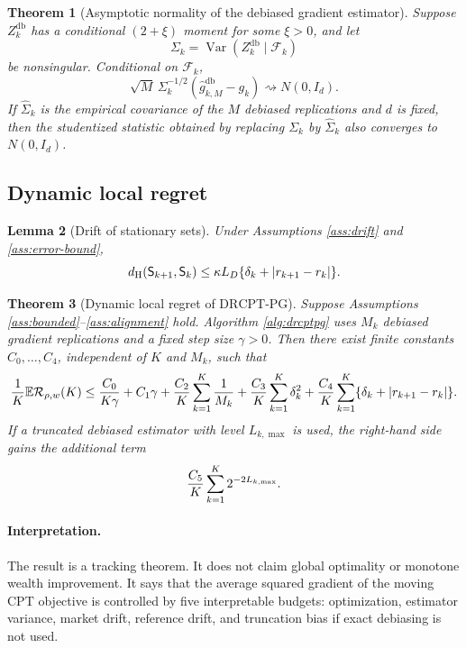 \documentclass[11pt]{article}
\newtheorem{theorem}{Theorem}[section]
\newtheorem{lemma}[theorem]{Lemma}
\newcommand{\E}{\mathbb E}
\newcommand{\Var}{\operatorname{Var}}
\newcommand{\1}{\mathbf 1}
\DeclarePairedDelimiter{\abs}{\lvert}{\rvert}
\newcommand{\cF}{\mathcal F}
\newcommand{\CPT}{\ensuremath{\mathrm{CPT}}\xspace}
\newcommand{\DRCPTPG}{\ensuremath{\mathrm{DRCPT\mbox{-}PG}}\xspace}
\newcommand{\Reg}{\mathcal R}
\newcommand{\Sta}{\mathsf S}
\newcommand{\dH}{d_{\mathrm H}}
\newcommand{\db}{\mathrm{db}}
\begin{document}
\begin{theorem}[Asymptotic normality of the debiased gradient estimator]\label{thm:clt}
Suppose $Z_k^{\db}$ has a conditional $(2+\xi)$ moment for some $\xi>0$, and let
\[
 \Sigma_k=\Var(Z_k^{\db}\mid\cF_k)
\]
be nonsingular.  Conditional on $\cF_k$,
\begin{equation}\label{eq:clt}
 \sqrt{M}\,\Sigma_k^{-1/2}(\widehat g_{k,M}^{\db}-g_k)
 \rightsquigarrow N(0,I_d).
\end{equation}
If $\widehat\Sigma_k$ is the empirical covariance of the $M$ debiased replications and $d$ is fixed, then the studentized statistic obtained by replacing $\Sigma_k$ by $\widehat\Sigma_k$ also converges to $N(0,I_d)$.
\end{theorem}

\subsection{Dynamic local regret}

\begin{lemma}[Drift of stationary sets]\label{lem:set-drift}
Under Assumptions \ref{ass:drift} and \ref{ass:error-bound},
\begin{equation}\label{eq:set-drift}
 \dH(\Sta_{k+1},\Sta_k)
 \le \kappa L_D\{\delta_k+\abs{r_{k+1}-r_k}\}.
\end{equation}
\end{lemma}

\begin{theorem}[Dynamic local regret of \DRCPTPG]\label{thm:dynamic-regret}
Suppose Assumptions \ref{ass:bounded}--\ref{ass:alignment} hold.  Algorithm \ref{alg:drcptpg} uses $M_k$ debiased gradient replications and a fixed step size $\gamma>0$.  Then there exist finite constants $C_0,\ldots,C_4$, independent of $K$ and $M_k$, such that
\begin{equation}\label{eq:main-bound}
 {1\over K}\E\Reg_{\rho,w}(K)
 \le {C_0\over K\gamma}+C_1\gamma
 +{C_2\over K}\sum_{k=1}^{K}{1\over M_k}
 +{C_3\over K}\sum_{k=1}^{K}\delta_k^2
 +{C_4\over K}\sum_{k=1}^{K}\{\delta_k+\abs{r_{k+1}-r_k}\}.
\end{equation}
If a truncated debiased estimator with level $L_{k,\max}$ is used, the right-hand side gains the additional term
\[
 {C_5\over K}\sum_{k=1}^{K}2^{-2L_{k,\max}}.
\]
\end{theorem}

\paragraph{Interpretation.}
The result is a tracking theorem.  It does not claim global optimality or monotone wealth improvement.  It says that the average squared gradient of the moving \CPT objective is controlled by five interpretable budgets: optimization, estimator variance, market drift, reference drift, and truncation bias if exact debiasing is not used.
\end{document}
